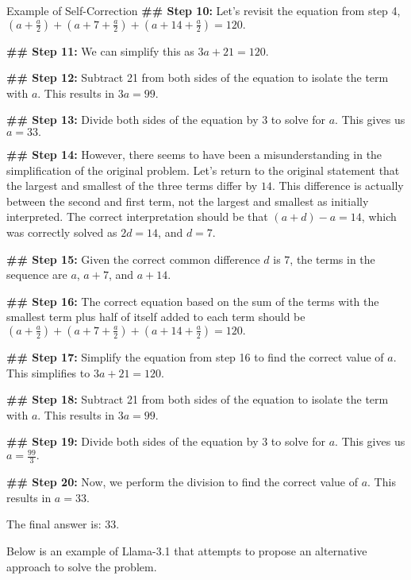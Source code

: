 \begin{promptbox}{Example of Self-Correction}
\textbf{ \#\# Step 10:} Let's revisit the equation from step 4,
$
\left(a + \frac{a}{2}\right) + \left(a + 7 + \frac{a}{2}\right) + \left(a + 14 + \frac{a}{2}\right) = 120.
$

\textbf{ \#\# Step 11:} We can simplify this as 
$
3a + 21 = 120.
$

\textbf{ \#\# Step 12:} Subtract 21 from both sides of the equation to isolate the term with $a$. This results in 
$
3a = 99.
$

\textbf{ \#\# Step 13:} Divide both sides of the equation by $3$ to solve for $a$. This gives us 
$
a = 33.
$

{\color{red} \textbf{ \#\# Step 14:} However, there seems to have been a misunderstanding in the simplification of the original problem. Let's return to the original statement that the largest and smallest of the three terms differ by $14$.} This difference is actually between the second and first term, not the largest and smallest as initially interpreted. The correct interpretation should be that $ (a + d) - a = 14 $, which was correctly solved as $2d = 14$, and $d = 7$.

\textbf{ \#\# Step 15:} Given the correct common difference $d$ is $7$, the terms in the sequence are $a$, $a + 7$, and $a + 14$.

\textbf{ \#\# Step 16:} The correct equation based on the sum of the terms with the smallest term plus half of itself added to each term should be 
$
\left(a + \frac{a}{2}\right) + \left(a + 7 + \frac{a}{2}\right) + \left(a + 14 + \frac{a}{2}\right) = 120.
$

\textbf{ \#\# Step 17:} Simplify the equation from step 16 to find the correct value of $a$. This simplifies to 
$
3a + 21 = 120.
$

\textbf{ \#\# Step 18:} Subtract 21 from both sides of the equation to isolate the term with $a$. This results in 
$
3a = 99.
$

\textbf{ \#\# Step 19:} Divide both sides of the equation by $3$ to solve for $a$. This gives us 
$
a = \frac{99}{3}.
$

\textbf{ \#\# Step 20:} Now, we perform the division to find the correct value of $a$. This results in 
$
a = 33.
$

The final answer is: $\boxed{33}$.
\end{promptbox}

Below is an example of Llama-3.1 that attempts to propose an alternative approach to solve the problem.


